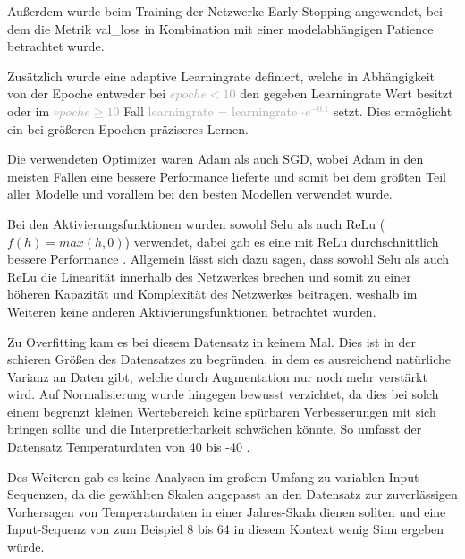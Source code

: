 \documentclass[manuscript,screen,review]{acmart} %
\begin{document}
Außerdem wurde beim Training der Netzwerke Early Stopping angewendet, bei dem die Metrik val\_loss in Kombination mit einer modelabhängigen Patience betrachtet wurde. 

Zusätzlich wurde eine adaptive Learningrate definiert, welche in Abhängigkeit von der Epoche entweder bei \textcolor{darkgray}{$epoche < 10$} den gegeben Learningrate Wert besitzt oder im \textcolor{darkgray}{$epoche \geq 10$} Fall \textcolor{darkgray}{learningrate = learningrate $\cdot e^{-0.1}$} setzt. Dies ermöglicht ein bei größeren Epochen präziseres Lernen.

Die verwendeten Optimizer waren Adam als auch SGD, wobei Adam in den meisten Fällen eine bessere Performance lieferte und somit bei dem größten Teil aller Modelle und vorallem bei den besten Modellen verwendet wurde.

Bei den Aktivierungsfunktionen wurden sowohl Selu  als auch ReLu ($f(h)=max(h,0)$) verwendet, dabei gab es eine mit ReLu durchschnittlich bessere Performance . Allgemein lässt sich dazu sagen, dass sowohl Selu als auch ReLu die Linearität innerhalb des Netzwerkes brechen und somit zu einer höheren Kapazität und Komplexität des Netzwerkes beitragen, weshalb im Weiteren keine anderen Aktivierungsfunktionen betrachtet wurden.

Zu Overfitting kam es bei diesem Datensatz in keinem Mal. Dies ist in der schieren Größen des Datensatzes zu begründen, in dem es ausreichend natürliche Varianz an Daten gibt, welche durch Augmentation nur noch mehr verstärkt wird.
Auf Normalisierung wurde hingegen bewusst verzichtet, da dies bei solch einem begrenzt kleinen Wertebereich keine spürbaren Verbesserungen mit sich bringen sollte und die Interpretierbarkeit schwächen könnte. So umfasst der Datensatz Temperaturdaten von 40 bis -40 .

Des Weiteren gab es keine Analysen im großem Umfang zu variablen Input-Sequenzen, da die gewählten Skalen angepasst an den Datensatz zur zuverlässigen Vorhersagen von Temperaturdaten in einer Jahres-Skala dienen sollten und eine Input-Sequenz von zum Beispiel 8 bis 64 in diesem Kontext wenig Sinn ergeben würde.

\end{document}
